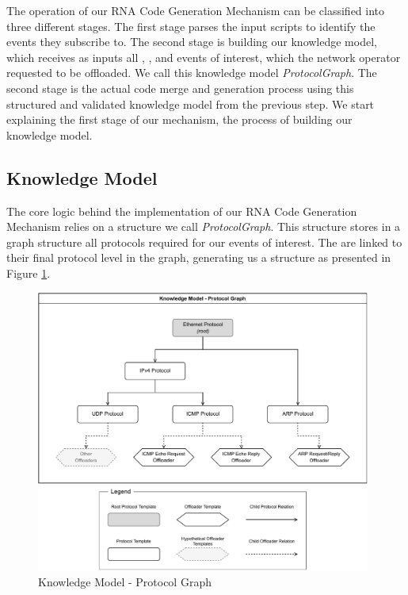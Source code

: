 The operation of our RNA Code Generation Mechanism can be classified into three different stages. The first stage parses the input scripts to identify the events they subscribe to. The second stage is building our knowledge model, which receives as inputs all \ProtocolTemplates{}, \Offloaders{}, and events of interest, which the network operator requested to be offloaded. We call this knowledge model \textit{ProtocolGraph}. The second stage is the actual code merge and generation process using this structured and validated knowledge model from the previous step. We start explaining the first stage of our mechanism, the process of building our knowledge model.

\subsection{Knowledge Model}

The core logic behind the implementation of our RNA Code Generation Mechanism relies on a structure we call \textit{ProtocolGraph}. This structure stores in a graph structure all protocols required for our events of interest. The \Offloaders{} are linked to their final protocol level in the graph, generating us a structure as presented in Figure \ref{fig:protocol_graph}.

\begin{figure}[htb]
    \caption{Knowledge Model - Protocol Graph}
    \begin{center}
        \includegraphics[width=0.98\textwidth]{images/icmp_ex_protocol_graph.pdf}  
    \end{center}
    \label{fig:protocol_graph}
\end{figure}

